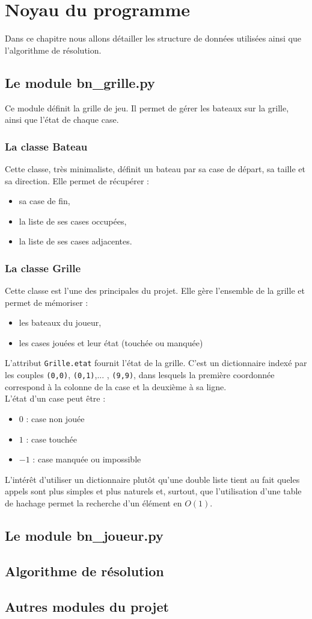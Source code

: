 \chapter{Noyau du programme}
Dans ce chapitre nous allons détailler les structure de données utilisées ainsi que l'algorithme de résolution.
\section{Le module bn\_grille.py}
Ce module définit la grille de jeu. Il permet de gérer les bateaux sur la grille, ainsi que l'état de chaque case.

\subsection{La classe Bateau}
Cette classe, très minimaliste, définit un bateau par sa case de départ, sa taille et sa direction. Elle permet de récupérer :
\begin{itemize}
\item sa case de fin,
\item la liste de ses cases occupées,
\item la liste de ses cases adjacentes.
\end{itemize}

\subsection{La classe Grille}
Cette classe est l'une des principales du projet. Elle gère l'ensemble de la grille et permet de mémoriser :
\begin{itemize}
\item les bateaux du joueur,
\item les cases jouées et leur état (touchée ou manquée)
\end{itemize}

L'attribut \texttt{Grille.etat} fournit l'état de la grille. C'est un dictionnaire indexé par les couples \texttt{(0,0)}, \texttt{(0,1)},... , \texttt{(9,9)}, dans lesquels la première coordonnée correspond à la colonne de la case et la deuxième à sa ligne.\\
L'état d'un case peut être :
\begin{itemize}
\item $0$ : case non jouée
\item $1$ : case touchée
\item $-1$ : case manquée ou impossible
\end{itemize}
L'intérêt d'utiliser un dictionnaire plutôt qu'une double liste tient au fait queles appels sont plus simples et plus naturels et, surtout, que l'utilisation d'une table de hachage permet la recherche d'un élément en $O(1)$.  


\section{Le module bn\_joueur.py}

\section{Algorithme de résolution}

\section{Autres modules du projet}




